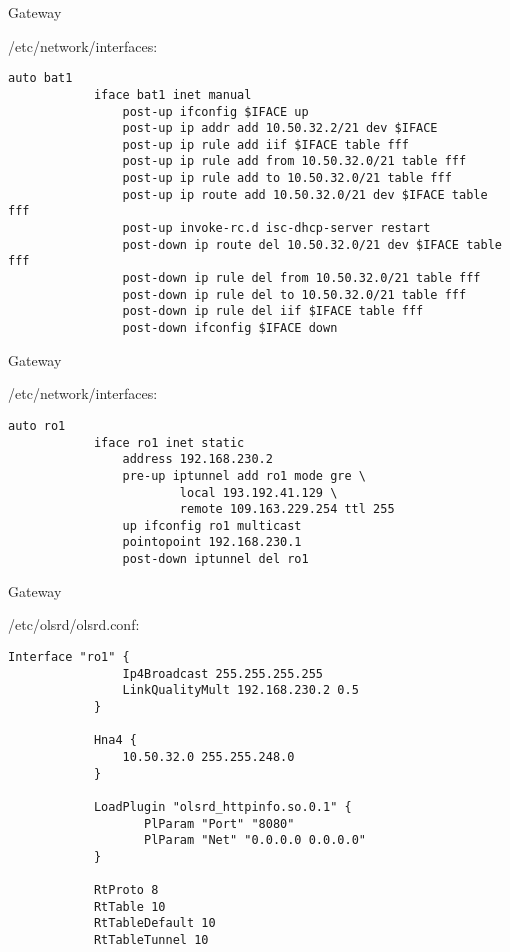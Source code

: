 \begin{frame}[fragile]{Gateway}
    \begin{block}{/etc/network/interfaces:}
        \scriptsize
        \begin{lstlisting}[gobble=12]
            auto bat1
            iface bat1 inet manual
                post-up ifconfig $IFACE up
                post-up ip addr add 10.50.32.2/21 dev $IFACE
                post-up ip rule add iif $IFACE table fff
                post-up ip rule add from 10.50.32.0/21 table fff
                post-up ip rule add to 10.50.32.0/21 table fff
                post-up ip route add 10.50.32.0/21 dev $IFACE table fff
                post-up invoke-rc.d isc-dhcp-server restart
                post-down ip route del 10.50.32.0/21 dev $IFACE table fff
                post-down ip rule del from 10.50.32.0/21 table fff
                post-down ip rule del to 10.50.32.0/21 table fff
                post-down ip rule del iif $IFACE table fff
                post-down ifconfig $IFACE down
        \end{lstlisting}
    \end{block}
\end{frame}

\begin{frame}[fragile]{Gateway}
    \begin{block}{/etc/network/interfaces:}
        \scriptsize
        \begin{lstlisting}[gobble=12]
            auto ro1
            iface ro1 inet static
                address 192.168.230.2
                pre-up iptunnel add ro1 mode gre \
                        local 193.192.41.129 \
                        remote 109.163.229.254 ttl 255
                up ifconfig ro1 multicast
                pointopoint 192.168.230.1
                post-down iptunnel del ro1
        \end{lstlisting}
    \end{block}
\end{frame}

\begin{frame}[fragile]{Gateway}
    \begin{block}{/etc/olsrd/olsrd.conf:}
        \scriptsize
        \begin{lstlisting}[gobble=12]
            Interface "ro1" {
                Ip4Broadcast 255.255.255.255
                LinkQualityMult 192.168.230.2 0.5
            }

            Hna4 {
                10.50.32.0 255.255.248.0
            }

            LoadPlugin "olsrd_httpinfo.so.0.1" {
                   PlParam "Port" "8080"
                   PlParam "Net" "0.0.0.0 0.0.0.0"
            }

            RtProto 8
            RtTable 10
            RtTableDefault 10
            RtTableTunnel 10
        \end{lstlisting}
    \end{block}
\end{frame}

